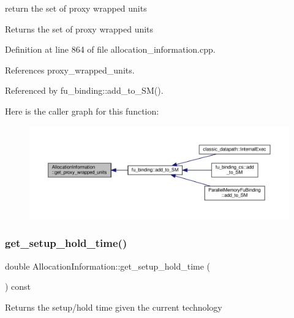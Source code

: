 return the set of proxy wrapped units 

\begin{DoxyReturn}{Returns}
the set of proxy wrapped units 
\end{DoxyReturn}


Definition at line 864 of file allocation\+\_\+information.\+cpp.



References proxy\+\_\+wrapped\+\_\+units.



Referenced by fu\+\_\+binding\+::add\+\_\+to\+\_\+\+S\+M().

Here is the caller graph for this function\+:
\nopagebreak
\begin{figure}[H]
\begin{center}
\leavevmode
\includegraphics[width=350pt]{d7/d79/classAllocationInformation_a60d95218cb3e60000e7a395a30442ba6_icgraph}
\end{center}
\end{figure}
\mbox{\label{classAllocationInformation_a29ab49e3d2401690bd30b11de24294cb}} 
\subsubsection{\texorpdfstring{get\+\_\+setup\+\_\+hold\+\_\+time()}{get\_setup\_hold\_time()}}
{\footnotesize\ttfamily double Allocation\+Information\+::get\+\_\+setup\+\_\+hold\+\_\+time (\begin{DoxyParamCaption}{ }\end{DoxyParamCaption}) const}

\begin{DoxyReturn}{Returns}
the setup/hold time given the current technology 
\end{DoxyReturn}


